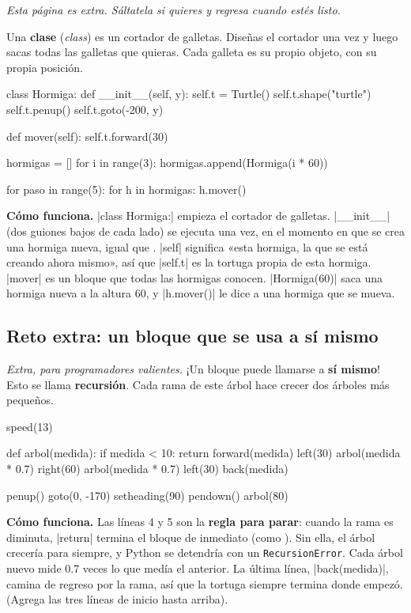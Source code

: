\textit{Esta página es extra. Sáltatela si quieres y regresa cuando estés listo.}

Una \textbf{clase} (\textit{class}) es un cortador de galletas. Diseñas el cortador una vez y luego sacas todas las galletas que quieras. Cada galleta es su propio objeto, con su propia posición.

\begin{code}
class Hormiga:
    def __init__(self, y):
        self.t = Turtle()
        self.t.shape("turtle")
        self.t.penup()
        self.t.goto(-200, y)

    def mover(self):
        self.t.forward(30)

hormigas = []
for i in range(3):
    hormigas.append(Hormiga(i * 60))

for paso in range(5):
    for h in hormigas:
        h.mover()
\end{code}

\textbf{Cómo funciona.} \py|class Hormiga:| empieza el cortador de galletas. \py|__init__| (dos guiones bajos de cada lado) se ejecuta una vez, en el momento en que se crea una hormiga nueva, igual que . \py|self| significa «esta hormiga, la que se está creando ahora mismo», así que \py|self.t| es la tortuga propia de esta hormiga. \py|mover| es un bloque que todas las hormigas conocen. \py|Hormiga(60)| saca una hormiga nueva a la altura 60, y \py|h.mover()| le dice a una hormiga que se mueva.

\subsection*{Reto extra: un bloque que se usa a sí mismo}

\textit{Extra, para programadores valientes.} ¡Un bloque puede llamarse a \textbf{sí mismo}! Esto se llama \textbf{recursión}. Cada rama de este árbol hace crecer dos árboles más pequeños.

\begin{code}
speed(13)

def arbol(medida):
    if medida < 10:
        return
    forward(medida)
    left(30)
    arbol(medida * 0.7)
    right(60)
    arbol(medida * 0.7)
    left(30)
    back(medida)

penup()
goto(0, -170)
setheading(90)
pendown()
arbol(80)
\end{code}

\textbf{Cómo funciona.} Las líneas 4 y 5 son la \textbf{regla para parar}: cuando la rama es diminuta, \py|return| termina el bloque de inmediato (como ). Sin ella, el árbol crecería para siempre, y Python se detendría con un \texttt{RecursionError}. Cada árbol nuevo mide 0.7 veces lo que medía el anterior. La última línea, \py|back(medida)|, camina de regreso por la rama, así que la tortuga siempre termina donde empezó. (Agrega las tres líneas de inicio hasta arriba).

